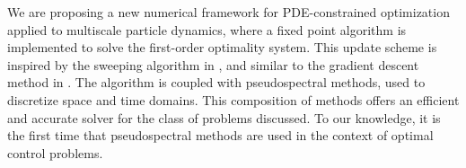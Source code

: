 We are proposing a new numerical framework for PDE-constrained optimization applied to multiscale particle dynamics, where a fixed point algorithm is implemented to solve the first-order optimality system. This update scheme is inspired by the sweeping algorithm in \cite{albi2016mean}, and similar to the gradient descent method in \cite{Burger1}. The algorithm is coupled with pseudospectral methods, used to discretize space and time domains. This composition of methods offers an efficient and accurate solver for the class of problems discussed. To our knowledge, it is the first time that pseudospectral methods are used in the context of optimal control problems.









